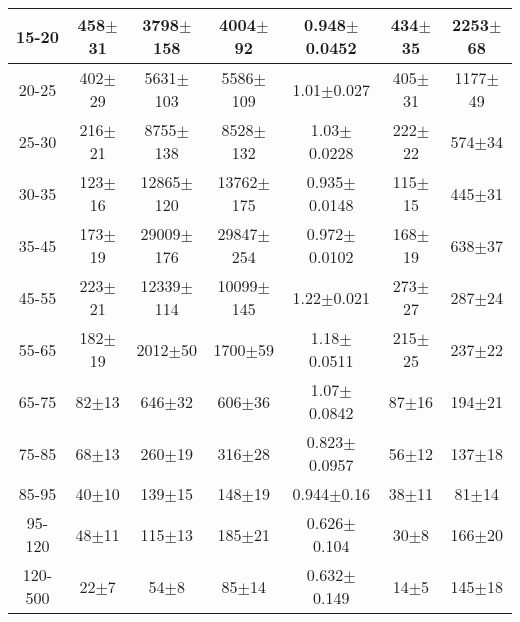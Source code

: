 \begin{table}[h]
\begin{center}
\begin{tabular}{|c|c|c|c|c|c|c|}
15-20 & 458$\pm$31 & 3798$\pm$158 & 4004$\pm$92 & 0.948$\pm$0.0452& 434$\pm$35& 2253$\pm$68 \\ \hline
20-25 & 402$\pm$29 & 5631$\pm$103 & 5586$\pm$109 & 1.01$\pm$0.027& 405$\pm$31& 1177$\pm$49 \\ \hline
25-30 & 216$\pm$21 & 8755$\pm$138 & 8528$\pm$132 & 1.03$\pm$0.0228& 222$\pm$22& 574$\pm$34 \\ \hline
30-35 & 123$\pm$16 & 12865$\pm$120 & 13762$\pm$175 & 0.935$\pm$0.0148& 115$\pm$15& 445$\pm$31 \\ \hline
35-45 & 173$\pm$19 & 29009$\pm$176 & 29847$\pm$254 & 0.972$\pm$0.0102& 168$\pm$19& 638$\pm$37 \\ \hline
45-55 & 223$\pm$21 & 12339$\pm$114 & 10099$\pm$145 & 1.22$\pm$0.021& 273$\pm$27& 287$\pm$24 \\ \hline
55-65 & 182$\pm$19 & 2012$\pm$50 & 1700$\pm$59 & 1.18$\pm$0.0511& 215$\pm$25& 237$\pm$22 \\ \hline
65-75 & 82$\pm$13 & 646$\pm$32 & 606$\pm$36 & 1.07$\pm$0.0842& 87$\pm$16& 194$\pm$21 \\ \hline
75-85 & 68$\pm$13 & 260$\pm$19 & 316$\pm$28 & 0.823$\pm$0.0957& 56$\pm$12& 137$\pm$18 \\ \hline
85-95 & 40$\pm$10 & 139$\pm$15 & 148$\pm$19 & 0.944$\pm$0.16& 38$\pm$11& 81$\pm$14 \\ \hline
95-120 & 48$\pm$11 & 115$\pm$13 & 185$\pm$21 & 0.626$\pm$0.104& 30$\pm$8& 166$\pm$20 \\ \hline
120-500 & 22$\pm$7 & 54$\pm$8 & 85$\pm$14 & 0.632$\pm$0.149& 14$\pm$5& 145$\pm$18 \\ \hline
  \end{tabular}
  \label{tab:EtoGAMMA_NoWMtCut}
  \end{center}
\end{table}
